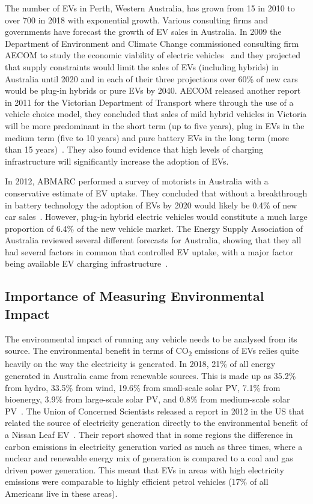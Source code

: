 The number of EVs in Perth, Western Australia, has grown from 15 in 2010 to over 700 in 2018 with exponential growth.  Various consulting firms and governments have forecast the growth of EV sales in Australia. In 2009 the Department of Environment and Climate Change commissioned consulting firm AECOM to study the economic viability of electric vehicles~\cite{aecom_australia_economic_2009} and they projected that supply constraints would limit the sales of EVs (including hybrids) in Australia until 2020 and in each of their three projections over 60\% of new cars would be plug-in hybrids or pure EVs by 2040. AECOM released another report in 2011 for the Victorian Department of Transport where through the use of a vehicle choice model, they concluded that sales of mild hybrid vehicles in Victoria will be more predominant in the short term (up to five years), plug in EVs in the medium term (five to 10 years) and pure battery EVs in the long term (more than 15 years)~\cite{kinghorn_forecast_2011}. They also found evidence that high levels of charging infrastructure will significantly increase the adoption of EVs. 

In 2012, ABMARC performed a survey of motorists in Australia with a conservative estimate of EV uptake. They concluded that without a breakthrough in battery technology the adoption of EVs by 2020 would likely be 0.4\% of new car sales~\cite{roberts_media_2012}. However, plug-in hybrid electric vehicles would constitute a much large proportion of 6.4\% of the new vehicle market.
The Energy Supply Association of Australia reviewed several different forecasts for Australia, showing that they all had several factors in common that controlled EV uptake, with a major factor being available EV charging infrastructure~\cite{energy_supply_association_of_australia_sparking_2013}.  

\subsection{Importance of Measuring Environmental Impact}
The environmental impact of running any vehicle needs to be analysed from its source. The environmental benefit in terms of CO\textsubscript{2} emissions of EVs relies quite heavily on the way the electricity is generated. In 2018, 21\% of all energy generated in Australia came from renewable sources. This is made up as 35.2\% from hydro, 33.5\% from wind, 19.6\% from small-scale solar PV, 7.1\% from bioenergy, 3.9\% from large-scale solar PV, and 0.8\% from medium-scale solar PV~\cite{clean_energy_council_clean_2019}. The Union of Concerned Scientists released a report in 2012 in the US that related the source of electricity generation directly to the environmental benefit of a Nissan Leaf EV~\cite{anair_state_2012}. Their report showed that in some regions the difference in carbon emissions in electricity generation varied as much as three times, where a nuclear and renewable energy mix of generation is compared to a coal and gas driven power generation. This meant that EVs in areas with high electricity emissions were comparable to highly efficient petrol vehicles (17\% of all Americans live in these areas).

